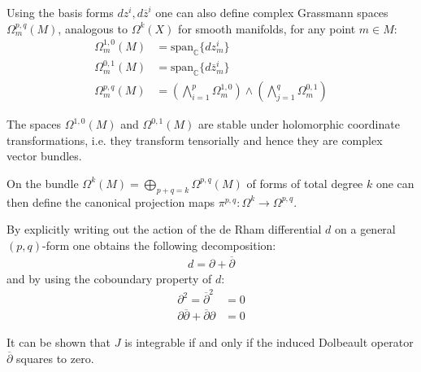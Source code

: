 	Using the basis forms $dz^i, d\overline{z}^i$ one can also define complex Grassmann spaces $\Omega^{p, q}_m(M)$, analogous to $\Omega^k(X)$ for smooth manifolds, for any point $m\in M$:
	\begin{align}
		\Omega^{1, 0}_m(M) &= \text{span}_{\mathbb{C}}\{dz^i_m\}\\
		\Omega^{0, 1}_m(M) &= \text{span}_{\mathbb{C}}\{d\overline{z}^i_m\}\\
		\Omega^{p, q}_m(M) &= \left(\bigwedge_{i=1}^p\Omega^{1, 0}_m\right)\wedge\left(\bigwedge_{j=1}^q\Omega^{0, 1}_m\right)
	\end{align}

	\begin{property}
		The spaces $\Omega^{1, 0}(M)$ and $\Omega^{0, 1}(M)$ are stable under holomorphic coordinate transformations, i.e. they transform tensorially and hence they are complex vector bundles.
	\end{property}
	On the bundle $\Omega^k(M) = \bigoplus_{p+q=k}\Omega^{p, q}(M)$ of forms of total degree $k$ one can then define the canonical projection maps $\pi^{p, q}:\Omega^k\rightarrow\Omega^{p, q}$.

	\begin{property}
		By explicitly writing out the action of the de Rham differential $d$ on a general $(p, q)$-form one obtains the following decomposition:
		\begin{gather}
			d = \partial + \overline{\partial}
		\end{gather}
		and by using the coboundary property of $d$:
		\begin{align}
			\partial^2 = \overline{\partial}^2 &= 0\\
			\partial\overline{\partial} + \overline{\partial}\partial &= 0
		\end{align}
	\end{property}
	\begin{remark}
		It can be shown that $J$ is integrable if and only if the induced Dolbeault operator $\overline{\partial}$ squares to zero.
	\end{remark}

